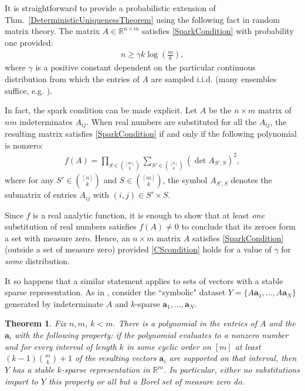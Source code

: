 \documentclass[journal, twocolumn]{IEEEtran}
\newtheorem{theorem}{Theorem}
\begin{document}
It is straightforward to provide a probabilistic extension of Thm.~\ref{DeterministicUniquenessTheorem} using the following fact in random matrix theory.  The matrix $A \in \mathbb{R}^{n \times m}$ satisfies \eqref{SparkCondition} with probability one
provided:
\begin{align}\label{CScondition}
n \geq \gamma k\log\left(\frac{m}{k}\right),
\end{align}
where $\gamma$ is a positive constant dependent on the particular continuous distribution from which the entries of $A$ are sampled i.i.d. (many ensembles suffice, e.g. \cite[Sec.~4]{Baraniuk08}). 

In fact, the spark condition can be made explicit.  Let $A$  be the $n \times m$ matrix of $nm$ indeterminates $A_{ij}$. When real numbers are substituted for all the $A_{ij}$, the resulting matrix satisfies \eqref{SparkCondition} if and only if the following polynomial is nonzero:
\begin{align*}
f(A) = \prod_{S \in {[m] \choose k}} \sum_{S' \in {[n] \choose k}} (\det A_{S',S})^2,
\end{align*}
%
where for any $S' \in {[n] \choose k}$ and $S \in {[m] \choose k}$, the symbol $A_{S',S}$ denotes the submatrix of entries $A_{ij}$ with $(i,j) \in S' \times S$. 

Since $f$ is a real analytic function, it is enough to show that at least \emph{one} substitution of real numbers satisfies $f(A) \neq 0$ to conclude that its zeroes form a set with measure zero. Hence, an $n \times m$ matrix $A$ satisfies \eqref{SparkCondition} (outside a set of measure zero) provided \eqref{CScondition} holds for a value of $\gamma$ for \emph{some}  distribution. 

It so happens that a similar statement applies to sets of vectors with a stable sparse representation. As in \cite[Sec.~IV]{Hillar15}, consider the ``symbolic" dataset $Y = \{A\mathbf{a}_1,\ldots,A \mathbf{a}_N\}$ generated by indeterminate $A$ and $k$-sparse $\mathbf{a}_1, \ldots, \mathbf{a}_N$. 
\begin{theorem}\label{robustPolythm} 
Fix $n, m$, $k < m$. There is a polynomial in the entries of $A$ and the $\mathbf{a}_i$ with the following property:  if the polynomial evaluates to a nonzero number and for every interval of length $k$ in some cyclic order on $[m]$ at least \mbox{$(k-1){m \choose k}+1$} of the resulting vectors $\mathbf{a}_i$ are supported on that interval, then $Y$ has a stable $k$-sparse representation in $\mathbb{R}^m$. In particular, either no substitutions impart to $Y$ this property or all but a Borel set of measure zero do. 
\end{theorem}
\end{document}
